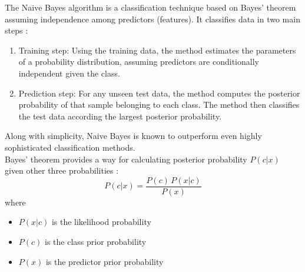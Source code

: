 The Naive Bayes algorithm is a classification technique based on Bayes' theorem assuming independence among predictors (features). It classifies data in two main steps \cite{matlab_naiveBayes}:
\begin{enumerate}
	\item Training step: Using the training data, the method estimates the parameters of a probability distribution, assuming predictors are conditionally independent given the class.
	\item Prediction step: For any unseen test data, the method computes the posterior probability of that sample belonging to each class. The method then classifies the test data according the largest posterior probability.
\end{enumerate}

Along with simplicity, Naive Bayes is known to outperform even highly sophisticated classification methods. \\

Bayes' theorem provides a way for calculating posterior probability $P(c|x)$ given other three probabilities \cite{wolfram_BayesTheorem}:
\begin{equation} \label{eq:posterior_prob}
P(c|x) = \frac{P(c) \, P(x|c)}{P(x)}
\end{equation}
where
\begin{itemize}
	\item $P(x|c)$ is the likelihood probability
	\item $P(c)$ is the class prior probability 
	\item $P(x)$ is the predictor prior probability
\end{itemize}
